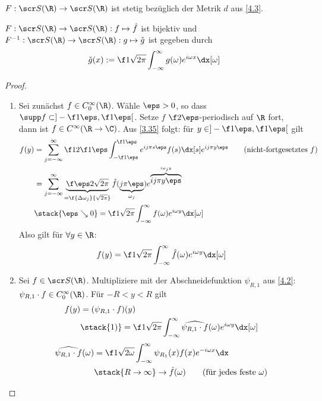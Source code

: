 \begin{nt} \label{4.9}
	$F : \scr S(\R) \to \scr S(\R)$ ist stetig bezüglich der Metrik $d$ aus \ref{4.3}.
\end{nt}

\begin{st} \label{4.10}
	$F: \scr S(\R) \to \scr S(\R): f \mapsto \hat f$ ist bijektiv und $F^{-1}: \scr S(\R) \to \scr S(\R) : g \mapsto \check g$ ist gegeben durch
	\[
		\check g(x) := \f 1{\sqrt{2\pi}} \int_{-\infty}^\infty g(\omega) e^{i \omega x} \dx[\omega]
	\]
	\begin{proof}
		\begin{enumerate}[1)]
			\item
				Sei zunächst $f \in C_0^\infty(\R)$.
				Wähle $\eps > 0$, so dass $\supp f \subset ]-\f 1\eps, \f 1\eps[$.
				Setze $f$ $\f 2\eps$-periodisch auf $\R$ fort, dann ist $f \in C^\infty (\R \to \C)$.
				Aus \ref{3.35} folgt: für $y \in ]-\f 1\eps, \f 1\eps[$ gilt
				\begin{align*}
					f(y) 
					&= \sum_{j=-\infty}^\infty \f 1{2 \f 1\eps} \int_{-\f 1\eps}^{\f 1\eps} e^{ij\pi s \eps} f(s) \dx[s] e^{ij\pi y \eps} \qquad \text{(nicht-fortgesetztes $f$)}\\
					&= \sum_{j=-\infty}^\infty \underbrace{\f \eps 2 \sqrt{2\pi}}_{= \f {\Delta \omega_j}{\sqrt{2\pi}}} \hat f(\underbrace{j\pi \eps}_{\omega_j}) e^{\overbrace{ij\pi y \eps}^{i\omega_j y}} \\
					&\stack{\eps \searrow 0}= \f 1{\sqrt{2\pi}} \int_{-\infty}^\infty f(\omega) e^{i\omega y} \dx[\omega]
				\end{align*}
				Also gilt für $\forall y \in \R$:
				\[
					f(y) = \f 1{\sqrt{2\pi}} \int_{-\infty}^\infty \hat f(\omega) e^{i \omega y} \dx[\omega]
				\]
			\item
				Sei $f \in \scr S(\R)$.
				Multipliziere mit der Abschneidefunktion $\psi_{R,1}$ aus \ref{4.2}: $\psi_{R,1}\cdot f \in C_0^\infty(\R)$.
				Für $-R < y < R$ gilt
				\begin{align*}
					f(y) 
					&= (\psi_{R,1}\cdot f)(y) \\
					&\stack{1)}= \f 1{\sqrt{2\pi}} \int_{-\infty}^\infty \widehat{\psi_{R,1} \cdot f}(\omega) e^{i\omega y} \dx[\omega]
				\end{align*}
				\begin{align*}
					\widehat{\psi_{R,1} \cdot f}(\omega) 
					&= \f 1{\sqrt{2\omega}} \int_{-\infty}^\infty \psi_{R_1}(x) f(x) e^{-i \omega x} \dx \\
					&\stack{R\to \infty}\to \hat f(\omega)  \qquad \text{(für jedes feste $\omega$)}

\end{align*}
\end{enumerate}
\end{proof}
\end{st}
